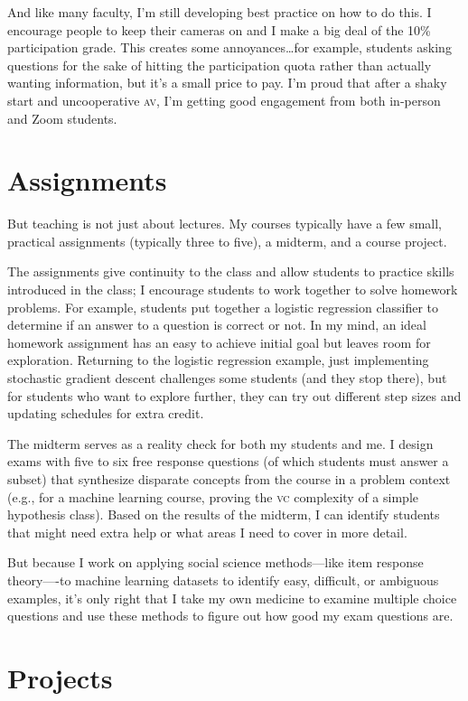\documentclass[11pt]{amsart}
\newcommand{\abr}[1]{\textsc{#1}}
\begin{document}
And like many faculty, I'm still developing best practice on how to do
this.  I encourage people to keep their cameras on and I make a big
deal of the 10\% participation grade.  This creates some
annoyances\dots for example, students asking questions for the sake of
hitting the participation quota rather than actually wanting
information, but it's a small price to pay.  I'm proud that after a
shaky start and uncooperative \abr{av}, I'm getting good engagement
from both in-person and Zoom students.

\section{Assignments}

But teaching is not just about lectures.  My courses typically have a
few small, practical assignments (typically three to five), a midterm,
and a course project.

The assignments give continuity to the class and allow students to
practice skills introduced in the class; I encourage students to work
together to solve homework problems.
%
For example, students put together a logistic regression classifier to
determine if an answer to a question is correct or not.  In my mind,
an ideal homework assignment has an easy to achieve initial goal but
leaves room for exploration.  Returning to the logistic regression
example, just implementing stochastic gradient descent challenges some
students (and they stop there), but for students who want to explore
further, they can try out different step sizes and updating schedules
for extra credit.

The midterm serves as a reality check for both my students and me.  I
design exams with five to six free response questions (of which
students must answer a subset) that synthesize disparate concepts from
the course in a problem context (e.g., for a machine learning course,
proving the \abr{vc} complexity of a simple hypothesis class).  Based
on the results of the midterm, I can identify students that might need
extra help or what areas I need to cover in more detail.

But because I work on applying social science methods—like item
response theory—-to machine learning datasets to identify easy,
difficult, or ambiguous examples, it's only right that I take my own
medicine to examine multiple choice questions and use these methods to
figure out how good my exam questions are.

\section{Projects}
\end{document}
